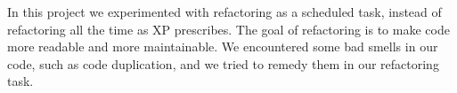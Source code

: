 In this project we experimented with refactoring as a scheduled task, instead of refactoring all the time as XP prescribes. The goal of refactoring is to make code more readable and more maintainable. We encountered some bad smells in our code, such as code duplication, and we tried to remedy them in our refactoring task. %